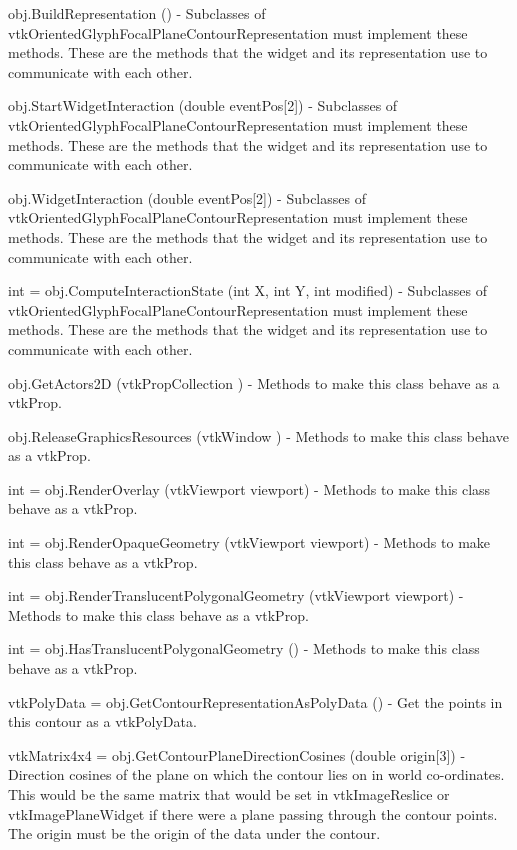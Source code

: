 \begin{DoxyItemize}
\item {\ttfamily obj.\-Build\-Representation ()} -\/ Subclasses of vtk\-Oriented\-Glyph\-Focal\-Plane\-Contour\-Representation must implement these methods. These are the methods that the widget and its representation use to communicate with each other.  
\item {\ttfamily obj.\-Start\-Widget\-Interaction (double event\-Pos\mbox{[}2\mbox{]})} -\/ Subclasses of vtk\-Oriented\-Glyph\-Focal\-Plane\-Contour\-Representation must implement these methods. These are the methods that the widget and its representation use to communicate with each other.  
\item {\ttfamily obj.\-Widget\-Interaction (double event\-Pos\mbox{[}2\mbox{]})} -\/ Subclasses of vtk\-Oriented\-Glyph\-Focal\-Plane\-Contour\-Representation must implement these methods. These are the methods that the widget and its representation use to communicate with each other.  
\item {\ttfamily int = obj.\-Compute\-Interaction\-State (int X, int Y, int modified)} -\/ Subclasses of vtk\-Oriented\-Glyph\-Focal\-Plane\-Contour\-Representation must implement these methods. These are the methods that the widget and its representation use to communicate with each other.  
\item {\ttfamily obj.\-Get\-Actors2\-D (vtk\-Prop\-Collection )} -\/ Methods to make this class behave as a vtk\-Prop.  
\item {\ttfamily obj.\-Release\-Graphics\-Resources (vtk\-Window )} -\/ Methods to make this class behave as a vtk\-Prop.  
\item {\ttfamily int = obj.\-Render\-Overlay (vtk\-Viewport viewport)} -\/ Methods to make this class behave as a vtk\-Prop.  
\item {\ttfamily int = obj.\-Render\-Opaque\-Geometry (vtk\-Viewport viewport)} -\/ Methods to make this class behave as a vtk\-Prop.  
\item {\ttfamily int = obj.\-Render\-Translucent\-Polygonal\-Geometry (vtk\-Viewport viewport)} -\/ Methods to make this class behave as a vtk\-Prop.  
\item {\ttfamily int = obj.\-Has\-Translucent\-Polygonal\-Geometry ()} -\/ Methods to make this class behave as a vtk\-Prop.  
\item {\ttfamily vtk\-Poly\-Data = obj.\-Get\-Contour\-Representation\-As\-Poly\-Data ()} -\/ Get the points in this contour as a vtk\-Poly\-Data.  
\item {\ttfamily vtk\-Matrix4x4 = obj.\-Get\-Contour\-Plane\-Direction\-Cosines (double origin\mbox{[}3\mbox{]})} -\/ Direction cosines of the plane on which the contour lies on in world co-\/ordinates. This would be the same matrix that would be set in vtk\-Image\-Reslice or vtk\-Image\-Plane\-Widget if there were a plane passing through the contour points. The origin must be the origin of the data under the contour.  

\end{DoxyItemize}
